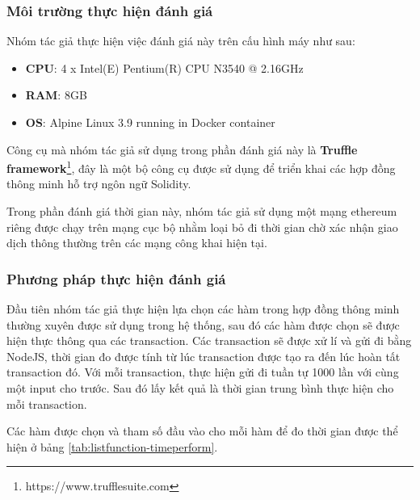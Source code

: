 \documentclass[../main-report.tex]{subfiles}
\begin{document}
\subsubsection{Môi trường thực hiện đánh giá}
Nhóm tác giả thực hiện việc đánh giá này trên cấu hình máy như sau:

\begin{itemize}
\item \textbf{CPU}: 4 x Intel(E) Pentium(R) CPU N3540 @ 2.16GHz
\item \textbf{RAM}: 8GB
\item \textbf{OS}: Alpine Linux 3.9 running in Docker container
\end{itemize}

Công cụ mà nhóm tác giả sử dụng trong phần đánh giá này là \textbf{Truffle framework}\footnote{https://www.trufflesuite.com}, đây là một bộ công cụ được sử dụng để triển khai các hợp đồng thông minh hỗ trợ ngôn ngữ Solidity.

Trong phần đánh giá thời gian này, nhóm tác giả sử dụng một mạng ethereum riêng được chạy trên mạng cục bộ nhằm loại bỏ đi thời gian chờ xác nhận giao dịch thông thường trên các mạng công khai hiện tại.

\subsubsection{Phương pháp thực hiện đánh giá}
Đầu tiên nhóm tác giả thực hiện lựa chọn các hàm trong hợp đồng thông minh thường xuyên được sử dụng trong hệ thống, sau đó các hàm được chọn sẽ được hiện thực thông qua các \gls{transaction}. Các \gls{transaction} sẽ được xử lí và gửi đi bằng NodeJS, thời gian đo được tính từ lúc \gls{transaction} được tạo ra đến lúc hoàn tất \gls{transaction} đó. Với mỗi \gls{transaction}, thực hiện gửi đi tuần tự 1000 lần với cùng một input cho trước. Sau đó lấy kết quả là thời gian trung bình thực hiện cho mỗi \gls{transaction}.

Các hàm được chọn và tham số đầu vào cho mỗi hàm để đo thời gian được thể hiện ở bảng \ref{tab:listfunction-timeperform}.
\end{document}
